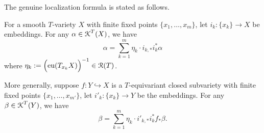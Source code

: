 The genuine localization formula is stated as follows.

\begin{theorem}\label{thm:localization_formula}
For a smooth $T$-variety $X$ with finite fixed points $\{x_1,\ldots,x_m \}$, let $i_k: \{x_k\} \longrightarrow X$ be embeddings. For any $\alpha \in \operatorname{\operatorname{\mathcal{K}}}^T(X)$, we have
$$\alpha= \sum_{k=1}^{m} \eta_k \cdot i_{k,*}i_{k}^* \alpha $$
where $\eta_k:= \left(\!\rule{0mm}{3.5mm} \eu(T_{x_k}X) \right)^{-1} \in \Rptc(T)$.

More generally, suppose $f: Y \hookrightarrow X$ is a $T$-equivariant closed subvariety with finite fixed points $\{x_1,\ldots,x_{m'} \}$, let $i'_k: \{x_k\} \longrightarrow Y$ be the embeddings. For any $\beta \in \operatorname{\operatorname{\mathcal{K}}}^T(Y)$, we have
$$\beta= \sum_{k=1}^{m} \eta_k \cdot i'_{k,*}i_{k}^* f_{*} \beta. $$

\end{theorem}

